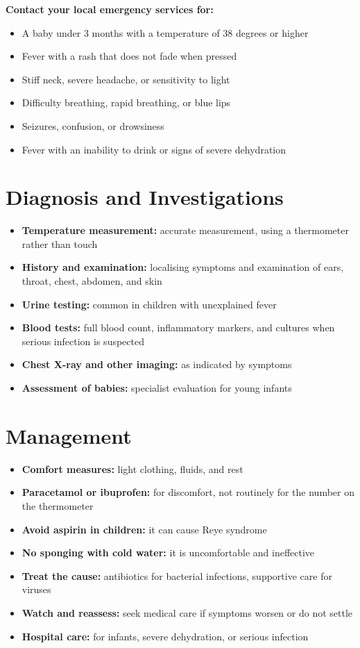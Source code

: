 \textbf{Contact your local emergency services for:}
\begin{itemize}
    \item A baby under 3 months with a temperature of 38 degrees or higher
    \item Fever with a rash that does not fade when pressed
    \item Stiff neck, severe headache, or sensitivity to light
    \item Difficulty breathing, rapid breathing, or blue lips
    \item Seizures, confusion, or drowsiness
    \item Fever with an inability to drink or signs of severe dehydration
\end{itemize}

\section*{Diagnosis and Investigations}
\begin{itemize}
    \item \textbf{Temperature measurement:} accurate measurement, using a thermometer rather than touch
    \item \textbf{History and examination:} localising symptoms and examination of ears, throat, chest, abdomen, and skin
    \item \textbf{Urine testing:} common in children with unexplained fever
    \item \textbf{Blood tests:} full blood count, inflammatory markers, and cultures when serious infection is suspected
    \item \textbf{Chest X-ray and other imaging:} as indicated by symptoms
    \item \textbf{Assessment of babies:} specialist evaluation for young infants
\end{itemize}

\section*{Management}
\begin{itemize}
    \item \textbf{Comfort measures:} light clothing, fluids, and rest
    \item \textbf{Paracetamol or ibuprofen:} for discomfort, not routinely for the number on the thermometer
    \item \textbf{Avoid aspirin in children:} it can cause Reye syndrome
    \item \textbf{No sponging with cold water:} it is uncomfortable and ineffective
    \item \textbf{Treat the cause:} antibiotics for bacterial infections, supportive care for viruses
    \item \textbf{Watch and reassess:} seek medical care if symptoms worsen or do not settle
    \item \textbf{Hospital care:} for infants, severe dehydration, or serious infection
\end{itemize}

